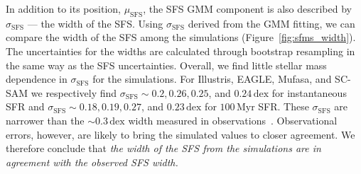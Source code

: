\documentclass[tighten, preprint]{aastex62}
\begin{document}

In addition to its position, $\mu_\mathrm{SFS}$, the SFS GMM component 
is also described by $\sigma_\mathrm{SFS}$ --- the width of the SFS. 
Using $\sigma_\mathrm{SFS}$ derived from the GMM fitting, 
we can compare the width of the SFS among the simulations 
(Figure~\ref{fig:sfms_width}). The uncertainties for the widths are 
calculated through bootstrap resampling in the same way as the SFS 
uncertainties. Overall, we find little stellar mass 
dependence in $\sigma_\mathrm{SFS}$ for the simulations. For Illustris, 
EAGLE, {\sc Mufasa}, and SC-SAM we respectively find 
$\sigma_\mathrm{SFS}{\sim}0.2, 0.26, 0.25$, and $0.24\,\mathrm{dex}$ 
for instantaneous SFR and
$\sigma_\mathrm{SFS}{\sim}0.18, 0.19, 0.27$, and $0.23\,\mathrm{dex}$
for $100\,\mathrm{Myr}$ SFR. These $\sigma_\mathrm{SFS}$ are narrower 
than the ${\sim}0.3\,\mathrm{dex}$ width measured in 
observations~\citep[\emph{e.g.}][]{daddi2007, noeske2007, magdis2012, whitaker2012}. 
{\color{red} Observational errors, however, are likely to bring the simulated values to 
closer agreement.}
We therefore conclude that \emph{the width of the SFS from the simulations 
are in agreement with the observed SFS width.}
\end{document}
